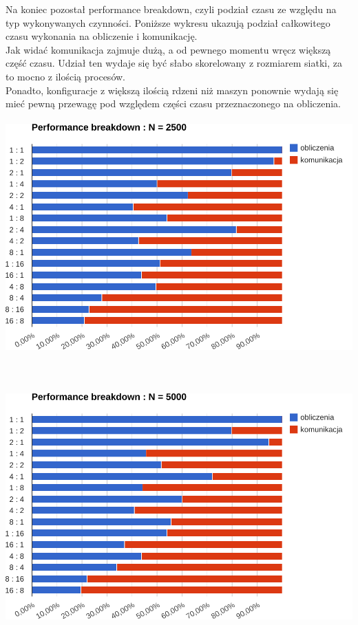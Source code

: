 \documentclass[paper=a4, fontsize=11pt]{scrartcl}	%
\numberwithin{equation}{section}		%
\numberwithin{figure}{section}			%
\numberwithin{table}{section}				%
\begin{document}
Na koniec pozostał performance breakdown, czyli podział czasu ze względu na typ
wykonywanych czynności. Poniższe wykresu ukazują podział całkowitego czasu
wykonania na obliczenie i komunikację. \\

Jak widać komunikacja zajmuje dużą, a od pewnego momentu wręcz większą część
czasu. Udział ten wydaje się być słabo skorelowany z rozmiarem siatki, za to
mocno z ilością procesów. \\

Ponadto, konfiguracje z większą ilością rdzeni niż maszyn ponownie wydają się
mieć pewną przewagę pod względem części czasu przeznaczonego na obliczenia. \\
\\


\includegraphics[width=135mm]{report/breakdown-2500.pdf} \\ \ \\ \ \\ \ \\

\includegraphics[width=135mm]{report/breakdown-5000.pdf} \\ \ \\ \ \\ \ \\
\end{document}
